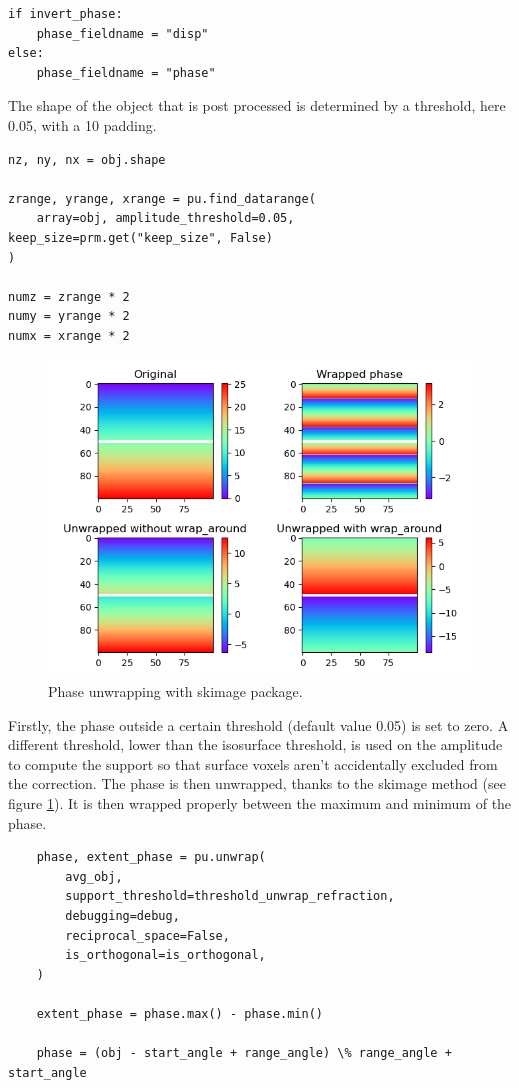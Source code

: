 \begin{verbatim}
if invert_phase:
    phase_fieldname = "disp"
else:
    phase_fieldname = "phase"
\end{verbatim}

The shape of the object that is post processed is determined by a threshold, here 0.05, with a 10 padding.
\begin{verbatim}
nz, ny, nx = obj.shape

zrange, yrange, xrange = pu.find_datarange(
	array=obj, amplitude_threshold=0.05, keep_size=prm.get("keep_size", False)
)

numz = zrange * 2
numy = yrange * 2
numx = xrange * 2
\end{verbatim}

\begin{figure}[ht]
    \centering
    \includegraphics[width=\textwidth]{Images/phase_unwrapping.png}
    \caption{Phase unwrapping with skimage package.}
    \label{fig:phase_unwrap_skimage}
\end{figure}

Firstly, the phase outside a certain threshold (default value 0.05) is set to zero. A different threshold, lower than the isosurface threshold, is used on the amplitude to compute the support so that surface voxels aren't accidentally excluded from the correction.
The phase is then unwrapped, thanks to the skimage method (see figure \ref{fig:phase_unwrap_skimage}). It is then wrapped properly between the maximum and minimum of the phase.

\begin{verbatim}
    phase, extent_phase = pu.unwrap(
        avg_obj,
        support_threshold=threshold_unwrap_refraction,
        debugging=debug,
        reciprocal_space=False,
        is_orthogonal=is_orthogonal,
    )
    
    extent_phase = phase.max() - phase.min()
    
    phase = (obj - start_angle + range_angle) \% range_angle + start_angle
\end{verbatim}

